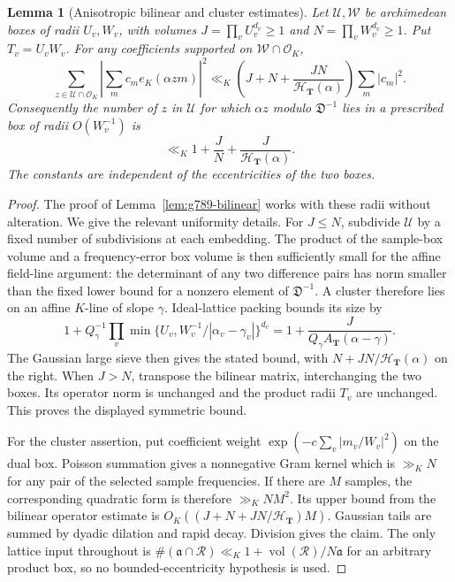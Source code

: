 \documentclass[11pt]{amsart}
\newtheorem{lemma}[theorem]{Lemma}
\theoremstyle{definition}
\numberwithin{equation}{section}
\begin{document}
\begin{lemma}[Anisotropic bilinear and cluster estimates]
\label{lem:anisotropic-bilinear}
Let $\mathcal U,\mathcal W$ be archimedean boxes of radii $U_v,W_v$,
with volumes $J=\prod_vU_v^{d_v}\ge1$ and
$N=\prod_vW_v^{d_v}\ge1$. Put $T_v=U_vW_v$.
For any coefficients supported on $\mathcal W\cap\mathcal O_K$,
\[
 \sum_{z\in\mathcal U\cap\mathcal O_K}
  \left|\sum_m c_m e_K(\alpha zm)\right|^2
 \ll_K \left(J+N+\frac{JN}{\mathcal H_{\mathbf T}(\alpha)}\right)
               \sum_m|c_m|^2.
\]
Consequently the number of $z$ in $\mathcal U$ for which $\alpha z$
modulo $\mathfrak D^{-1}$ lies in a prescribed box of radii $O(W_v^{-1})$
is
\[
 \ll_K 1+\frac JN+\frac J{\mathcal H_{\mathbf T}(\alpha)}.
\]
The constants are independent of the eccentricities of the two boxes.
\end{lemma}
\begin{proof}
The proof of Lemma~\ref{lem:g789-bilinear} works
with these radii without alteration. We give the relevant uniformity details.
For $J\le N$, subdivide $\mathcal U$ by a fixed number of subdivisions
at each embedding. The product of the sample-box volume and a
frequency-error box volume is then sufficiently small for the affine
field-line argument: the determinant of any two difference pairs has
norm smaller than the fixed lower bound for a nonzero element of
$\mathfrak D^{-1}$. A cluster therefore lies on an affine $K$-line of
slope $\gamma$. Ideal-lattice packing bounds its size by
\[
 1+Q_\gamma^{-1}
       \prod_v\min\{U_v,W_v^{-1}/|\alpha_v-\gamma_v|\}^{d_v}
 =1+\frac J{Q_\gamma A_{\mathbf T}(\alpha-\gamma)}.
\]
The Gaussian large sieve then gives the stated bound, with
$N+JN/\mathcal H_{\mathbf T}(\alpha)$ on the right. When $J>N$,
transpose the bilinear matrix, interchanging the two boxes. Its operator
norm is unchanged and the product radii $T_v$ are unchanged. This proves
the displayed symmetric bound.

For the cluster assertion, put coefficient weight
$\exp(-c\sum_v|m_v/W_v|^2)$ on the dual box. Poisson summation gives a
nonnegative Gram kernel which is $\gg_K N$ for any pair of the selected
sample frequencies. If there are $M$ samples, the corresponding quadratic
form is therefore $\gg_K NM^2$. Its upper bound from the bilinear operator
estimate is $O_K((J+N+JN/\mathcal H_{\mathbf T})M)$.
Gaussian tails are summed by dyadic dilation and rapid decay. Division
gives the claim. The only lattice input throughout is
$\#(\mathfrak a\cap\mathcal R)\ll_K1+\operatorname{vol}(\mathcal R)/N\mathfrak a$
for an arbitrary product box, so no bounded-eccentricity hypothesis is used.
\end{proof}
\end{document}
